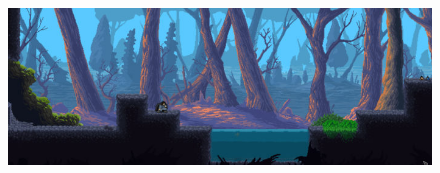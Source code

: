 \documentclass[a4paper, 12pt, twoside]{article}
\begin{document}

    \begin{figure}[h!]
        \includegraphics[width=\linewidth]{forest.png}
    \end{figure}
    
    \newpage
\end{document}
